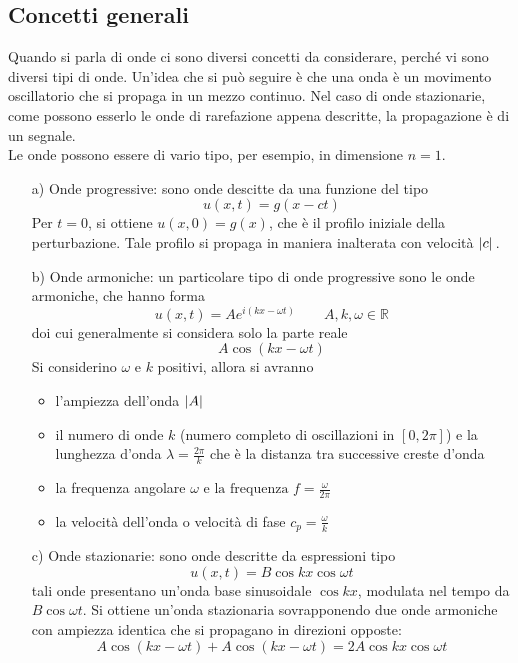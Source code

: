 \documentclass[a4paper,12pt, draft]{article}
\theoremstyle{break}
\numberwithin{equation}{section}
\begin{document}
\subsection{Concetti generali}
Quando si parla di onde ci sono diversi concetti da considerare, perché vi sono diversi tipi di onde. Un'idea che si può seguire è che una onda è un movimento oscillatorio che si propaga in un mezzo continuo. Nel caso di onde stazionarie, come possono esserlo le onde di rarefazione appena descritte, la propagazione è di un segnale. \\
Le onde possono essere di vario tipo, per esempio, in dimensione \(n = 1\).
\begin{itemize}
  \item[a)]Onde progressive: sono onde descitte da una funzione del tipo 
  \[
    u(x,t) = g(x - ct)
  \]
  Per \(t = 0\), si ottiene \(u(x,0) = g(x)\), che è il profilo iniziale della perturbazione. Tale profilo si propaga in maniera inalterata con velocità \(\abs*{c}\).
  \item[b)] Onde armoniche: un particolare tipo di onde progressive sono le onde armoniche, che hanno forma
  \begin{equation}
    u(x,t) = A e^{i(kx - \omega t)} \qquad A, k , \omega \in \mathbb{R}
  \end{equation}
  doi cui generalmente si considera solo la parte reale
  \[
    A \cos(kx - \omega t)
  \]
Si considerino \(\omega \mbox{ e } k\) positivi, allora si avranno
\begin{itemize}
  \item l'ampiezza dell'onda \(\abs*{A}\)
  \item il numero di onde \(k\) (numero completo di oscillazioni in \([0, 2\pi]\)) e la lunghezza d'onda \(\lambda = \frac{2\pi}{k}\) che è la distanza tra successive creste d'onda
  \item la frequenza angolare \(\omega \mbox{ e la frequenza } f = \frac{\omega}{2\pi}\)
  \item la velocità dell'onda o velocità di fase \(c_p = \frac{\omega}{k}\)
\end{itemize}
\item[c)] Onde stazionarie: sono onde descritte da espressioni tipo 
\[
  u(x,t) = B\cos kx \cos \omega t
\] 
tali onde presentano un'onda base sinusoidale \(\cos kx\), modulata nel tempo da \(B \cos \omega t\). Si ottiene un'onda stazionaria sovrapponendo due onde armoniche con ampiezza identica che si propagano in direzioni opposte:
\begin{equation}
  A\cos(kx-\omega t) + A\cos(kx-\omega t) = 2A\cos kx \cos \omega t
\end{equation}
\end{itemize}
\end{document}
